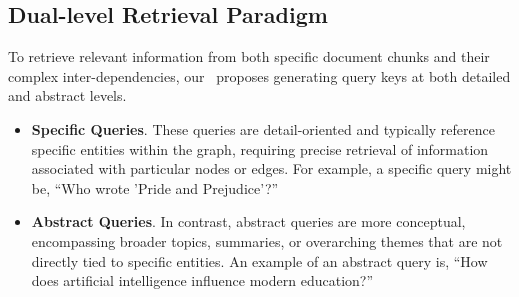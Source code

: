 
\subsection{Dual-level Retrieval Paradigm}
To retrieve relevant information from both specific document chunks and their complex inter-dependencies, our \model\ proposes generating query keys at both detailed and abstract levels.\vspace{-0.05in}
\begin{itemize}[leftmargin=*]

\item \textbf{Specific Queries}. These queries are detail-oriented and typically reference specific entities within the graph, requiring precise retrieval of information associated with particular nodes or edges. For example, a specific query might be, ``Who wrote 'Pride and Prejudice'?''

\item \textbf{Abstract Queries}. In contrast, abstract queries are more conceptual, encompassing broader topics, summaries, or overarching themes that are not directly tied to specific entities. An example of an abstract query is, ``How does artificial intelligence influence modern education?''

\end{itemize}



